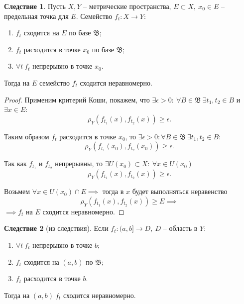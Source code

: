 \documentclass{report}
\theoremstyle{definition}
\newtheorem*{effect}{Следствие}
\begin{document}
\begin{effect}
  Пусть $X,Y$ -- метрические пространства, $E \subset X, \ x_0 \in E$ -- предельная точка для $E$. Семейство $f_t: X \rightarrow Y$:
  \begin{enumerate}
    \item $f_t$ сходится на $E$ по базе $\mathfrak{B}$;
    \item $f_t$ расходится в точке $x_0$ по базе $\mathfrak{B}$;
    \item $\forall t \ f_t$ непрерывно в точке $x_0$.
  \end{enumerate}

  Тогда на $E$ семейство $f_t$ сходится неравномерно.
\end{effect}

\begin{proof}
  Применим критерий Коши, покажем, что $\exists \epsilon > 0: \ \forall B \in \mathfrak{B} \ \exists t_1, t_2 \in B$ и $\exists x \in E$:
  \begin{equation*}
    \rho_Y(f_{t_1}(x), f_{t_2}(x)) \geqslant \epsilon.
  \end{equation*}

  Таким образом $f_t$ расходится в точке $x_0$, то $\exists \epsilon > 0: \forall B \in \mathfrak{B} \ \exists t_1,t_2 \in B$:
  \begin{equation*}
    \rho_Y(f_{t_1}(x_0), f_{t_2}(x_0)) \geqslant \epsilon.
  \end{equation*}

  Так как $f_{t_1}$ и $f_{t_2}$ непрерывны, то $\exists U(x_0)\subset X: \ \forall x \in U(x_0)$
  \begin{equation*}
    \rho_Y(f_{t_1}(x), f_{t_2}(x)) \geqslant \epsilon.
  \end{equation*}

  Возьмем $\forall x \in U(x_0) \cap E \implies$ тогда в $x$ будет выполняться неравенство
  \begin{equation*}
    \rho_Y(f_{t_1}(x), f_{t_2}(x))\geqslant E \implies
  \end{equation*}
  $\implies f_t$ на $E$ сходится неравномерно.
\end{proof}

\begin{effect}[из следствия]
  Если $f_t:(a,b] \rightarrow D, \ D$ -- область в $Y$:
  \begin{enumerate}
    \item $\forall t \ f_t$ непрерывно в точке $b$;
    \item $f_t$ сходится на $(a,b)$ по $\mathfrak{B}$;
    \item $f_t$ расходится в точке $b$.
  \end{enumerate}

  Тогда на $(a,b) \ f_t$ сходится неравномерно.
\end{effect}
\end{document}
